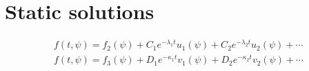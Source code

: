 \section{Static solutions}
\label{sec:static-solutions}

\begin{align}
  \label{eq:19}
  f(t,\psi)=f_2(\psi)+C_1 e^{-\lambda_1 t}u_1(\psi)+C_2e^{-\lambda_2
    t}u_2(\psi)+\cdots\\
  f(t,\psi)=f_3(\psi)+D_1e^{-\kappa_1 t}v_1(\psi)+D_2e^{-\kappa_2 t}v_2(\psi)+\cdots
\end{align}


